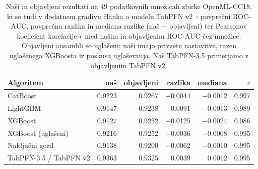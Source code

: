 \begin{table}[htbp]
\centering
\caption{Naši in objavljeni rezultati na 49 podatkovnih množicah zbirke OpenML-CC18, ki so tudi v dodatnem gradivu članka o modelu TabPFN v2~\cite{hollmann2025tabpfn}: povprečni ROC-AUC, povprečna razlika in mediana razlike (naš $-$ objavljeni) ter Pearsonov koeficient korelacije $r$ med našim in objavljenim ROC-AUC čez množice. Objavljeni ansambli so uglašeni; naši imajo privzete nastavitve, razen uglašenega XGBoosta iz poskusa uglaševanja. Naš TabPFN-3.5 primerjamo z objavljenim TabPFN v2.}
\label{tab:literatura}
\small
\begin{tabular}{lrrrrr}
\hline
Algoritem & naš & objavljeni & razlika & mediana & $r$ \\
\hline
CatBoost & \num{0.9223} & \num{0.9267} & \num[retain-explicit-plus]{-0.0044} & \num[retain-explicit-plus]{-0.0012} & \num{0.997} \\
LightGBM & \num{0.9147} & \num{0.9238} & \num[retain-explicit-plus]{-0.0091} & \num[retain-explicit-plus]{-0.0013} & \num{0.989} \\
XGBoost & \num{0.9127} & \num{0.9252} & \num[retain-explicit-plus]{-0.0125} & \num[retain-explicit-plus]{-0.0024} & \num{0.986} \\
XGBoost (uglašeni) & \num{0.9216} & \num{0.9252} & \num[retain-explicit-plus]{-0.0036} & \num[retain-explicit-plus]{-0.0008} & \num{0.995} \\
Naključni gozd & \num{0.9138} & \num{0.9200} & \num[retain-explicit-plus]{-0.0062} & \num[retain-explicit-plus]{-0.0010} & \num{0.995} \\
TabPFN-3.5 / TabPFN v2 & \num{0.9363} & \num{0.9325} & \num[retain-explicit-plus]{+0.0039} & \num[retain-explicit-plus]{+0.0012} & \num{0.995} \\
\hline
\end{tabular}
\end{table}
